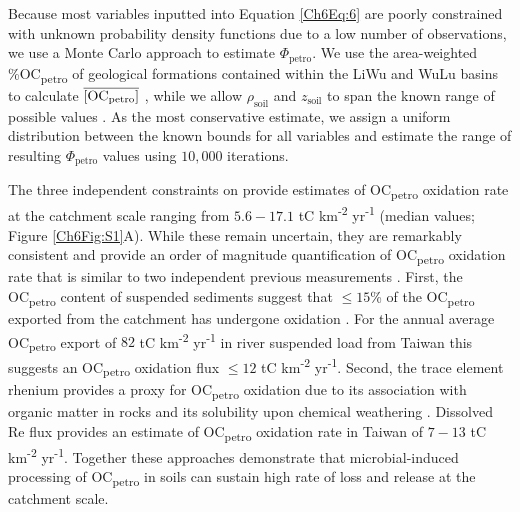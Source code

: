 \begin{enumerate}[label=(\textit{\roman*})]
\end{enumerate}

Because most variables inputted into Equation \ref{Ch6Eq:6} are poorly constrained with unknown probability density functions due to a low number of observations, we use a Monte Carlo approach to estimate $\Phi_{\text{petro}}$. We use the area-weighted \%OC\textsubscript{petro} of geological formations contained within the LiWu and WuLu basins to calculate $\overline{[\text{OC}_{\text{petro}}]}$ \citep[$0.24 \pm 0.06$\%;][]{Hilton:2010cg}, while we allow $\rho_{\text{soil}}$ and $z_{\text{soil}}$ to span the known range of possible values \citep[$2.0 - 2.5$ tons km\textsuperscript{-2} yr\textsuperscript{-1} and $0.2 - 0.9$ m, respectively;][]{Tsai:2001vp}. As the most conservative estimate, we assign a uniform distribution between the known bounds for all variables and estimate the range of resulting  $\Phi_{\text{petro}}$ values using $10,000$ iterations.

The three independent constraints on  provide estimates of OC\textsubscript{petro} oxidation rate at the catchment scale ranging from $5.6 - 17.1$ tC km\textsuperscript{-2} yr\textsuperscript{-1} (median values; Figure \ref{Ch6Fig:S1}A). While these remain uncertain, they are remarkably consistent and provide an order of magnitude quantification of OC\textsubscript{petro} oxidation rate that is similar to two independent previous measurements \citep[Figure \ref{Ch6Fig:S2}B;][]{Hilton:2011jw,Hilton:2014dh}. First, the OC\textsubscript{petro} content of suspended sediments suggest that $\leq 15$\% of the OC\textsubscript{petro} exported from the catchment has undergone oxidation \citep{Hilton:2011jw}. For the annual average OC\textsubscript{petro} export of $82$ tC km\textsuperscript{-2} yr\textsuperscript{-1} in river suspended load from Taiwan \citep{Hilton:2011jw} this suggests an OC\textsubscript{petro} oxidation flux $\leq12$ tC km\textsuperscript{-2} yr\textsuperscript{-1}. Second, the trace element rhenium provides a proxy for OC\textsubscript{petro} oxidation \citep{Jaffe:2002wya,Dalai:2002wg} due to its association with organic matter in rocks \citep{Selby:2003iq} and its solubility upon chemical weathering \citep{Colodner:1993tl}. Dissolved Re flux provides an estimate of OC\textsubscript{petro} oxidation rate in Taiwan of $7 - 13$ tC km\textsuperscript{-2} yr\textsuperscript{-1}. Together these approaches demonstrate that microbial-induced processing of OC\textsubscript{petro} in soils can sustain high rate of loss and  release at the catchment scale.

